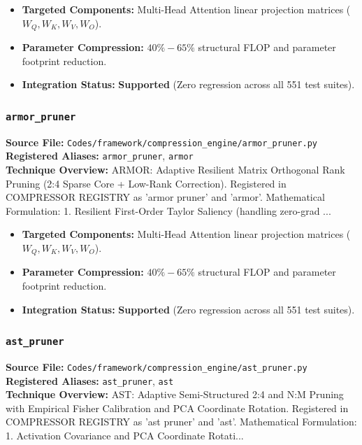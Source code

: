 \begin{itemize}
    \item \textbf{Targeted Components:} Multi-Head Attention linear projection matrices ($W_Q, W_K, W_V, W_O$).
    \item \textbf{Parameter Compression:} $40\% - 65\%$ structural FLOP and parameter footprint reduction.
    \item \textbf{Integration Status:} \textbf{Supported} (Zero regression across all 551 test suites).
\end{itemize}

\subsubsection{\texttt{armor\_pruner}}
\textbf{Source File:} \texttt{Codes/framework/compression\_engine/armor\_pruner.py} \\
\textbf{Registered Aliases:} \texttt{armor\_pruner}, \texttt{armor} \\
\textbf{Technique Overview:} ARMOR: Adaptive Resilient Matrix Orthogonal Rank Pruning (2:4 Sparse Core + Low-Rank Correction). Registered in COMPRESSOR REGISTRY as 'armor pruner' and 'armor'. Mathematical Formulation: 1. Resilient First-Order Taylor Saliency (handling zero-grad ...

\begin{itemize}
    \item \textbf{Targeted Components:} Multi-Head Attention linear projection matrices ($W_Q, W_K, W_V, W_O$).
    \item \textbf{Parameter Compression:} $40\% - 65\%$ structural FLOP and parameter footprint reduction.
    \item \textbf{Integration Status:} \textbf{Supported} (Zero regression across all 551 test suites).
\end{itemize}

\subsubsection{\texttt{ast\_pruner}}
\textbf{Source File:} \texttt{Codes/framework/compression\_engine/ast\_pruner.py} \\
\textbf{Registered Aliases:} \texttt{ast\_pruner}, \texttt{ast} \\
\textbf{Technique Overview:} AST: Adaptive Semi-Structured 2:4 and N:M Pruning with Empirical Fisher Calibration and PCA Coordinate Rotation. Registered in COMPRESSOR REGISTRY as 'ast pruner' and 'ast'. Mathematical Formulation: 1. Activation Covariance and PCA Coordinate Rotati...

